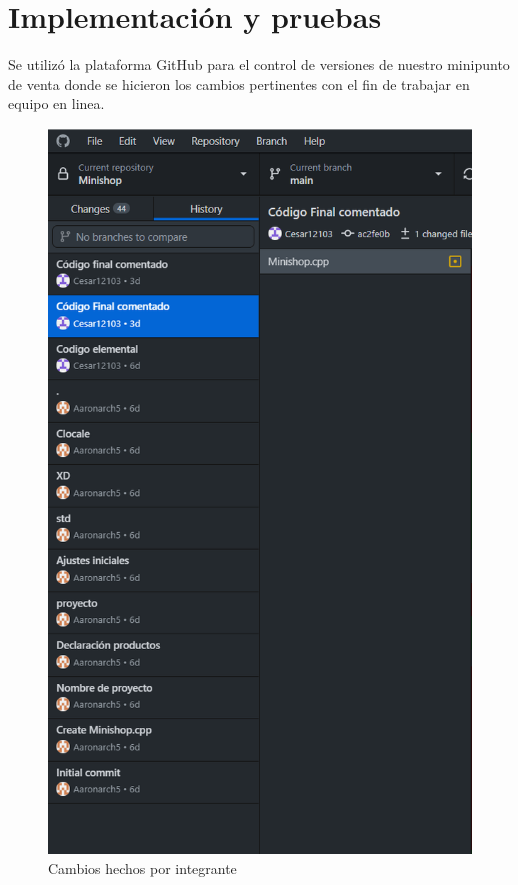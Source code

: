 \documentclass[letter,twocolumn]{revtex4}
\begin{document}
\clearpage

\section{Implementación y pruebas}
    Se utilizó la plataforma GitHub para el control de versiones de nuestro minipunto de venta donde se hicieron los cambios pertinentes con el fin de trabajar en equipo en linea.
    
    
    \begin{figure}[ht]
         \renewcommand\figurename{Fig.}
         \includegraphics[scale=0.3]{Images/Captura de pantalla (213).png}
         \caption{Cambios hechos por integrante}
    \end{figure}
    
\end{document}
